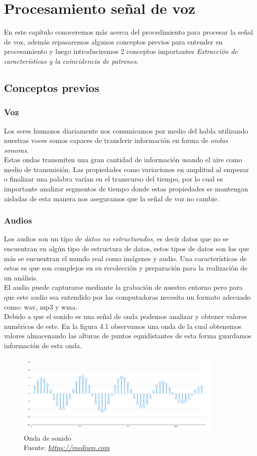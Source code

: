 \chapter{Procesamiento señal de voz}
En este capítulo conoceremos más acerca del procedimiento para procesar la señal de voz, además repasaremos algunos conceptos previos para entender en procesamiento y luego introduciremos 2 conceptos importantes \textit{Extracción de características y la coincidencia de patrones.}

\section{Conceptos previos}
\subsection{Voz}
Los seres humanos diariamente nos comunicamos por medio del habla utilizando nuestras voces somos capaces de transferir información en forma de \textit{ondas sonoras}.\\ Estas ondas transmiten una gran cantidad de información usando el aire como medio de transmisión.
Las propiedades como variaciones en amplitud al empezar o finalizar una palabra varían en el transcurso del tiempo, por lo cual es importante analizar segmentos de tiempo donde estas propiedades se mantengan aisladas de esta manera nos aseguramos que la señal de voz no cambie.
\subsection{Audios}
Los audios son un tipo de \textit{datos no estructurados}, es decir datos que no se encuentran en algún tipo de estructura de datos, estos tipos de datos son los que más se encuentran el mundo real como imágenes y audio. Una características de estos es que son complejos en su recolección y preparación para la realización de un análisis.\\ El audio puede capturarse mediante la grabación de nuestro entorno pero para que este audio sea entendido por las computadoras necesita un formato adecuado como: wav, mp3 y wma. \\
Debido a que el sonido es una señal de onda podemos analizar y obtener valores numéricos de este. En la figura 4.1 observamos una onda de la cual obtenemos valores almacenando las alturas de puntos equidistantes de esta forma guardamos información de esta onda.
\begin{figure}[H]
	\centering
	\includegraphics[width=0.9\textwidth]{Figures/onda.png}
	\caption{Onda de sonido \\ Fuente:  \href{https://medium.com/@venkateshpnk22/how-to-convert-your-speech-voice-to-text-data-1b2686099260}{\textit{https://medium.com}}}
	\label{onda2}
\end{figure} 
